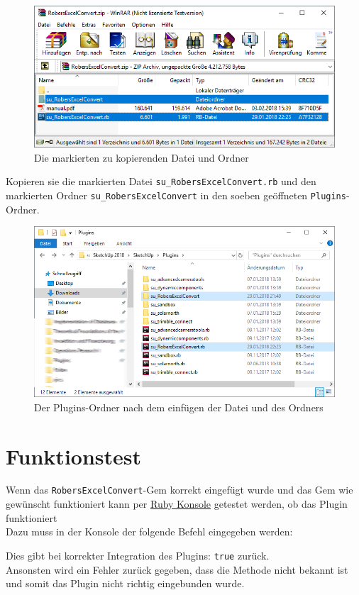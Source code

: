 \documentclass{book}
\newcommand{\robersexcelconvert}{\texttt{RobersExcelConvert}\xspace}
\begin{document}
\begin{enumerate}
						\begin{figure}[H]
							\centering
							\includegraphics[scale=0.6]{pics/plugins-ordner/zip-datei.png}
							\caption{Die markierten zu kopierenden Datei und Ordner}
						\end{figure}
						Kopieren sie die markierten Datei \texttt{su\_RobersExcelConvert.rb} und den markierten Ordner \texttt{su\_RobersExcelConvert} in den soeben geöffneten \texttt{Plugins}-Ordner.
						\begin{figure}[H]
							\centering
							\includegraphics[scale=0.6]{pics/plugins-ordner/plugins-ordner.png}
							\caption{Der Plugins-Ordner nach dem einfügen der Datei und des Ordners}
						\end{figure}
				\end{enumerate}
		\section{Funktionstest}
			Wenn das \robersexcelconvert-Gem korrekt eingefügt wurde und das Gem wie gewünscht funktioniert kann per \hyperref[Ruby Konsole]{Ruby Konsole} getestet werden, ob das Plugin funktioniert\\
			Dazu muss in der Konsole der folgende Befehl eingegeben werden:
			
			Dies gibt bei korrekter Integration des Plugins: \texttt{true} zurück.\\
			Ansonsten wird ein Fehler zurück gegeben, dass die Methode nicht bekannt ist und somit das Plugin nicht richtig eingebunden wurde.
\end{document}
